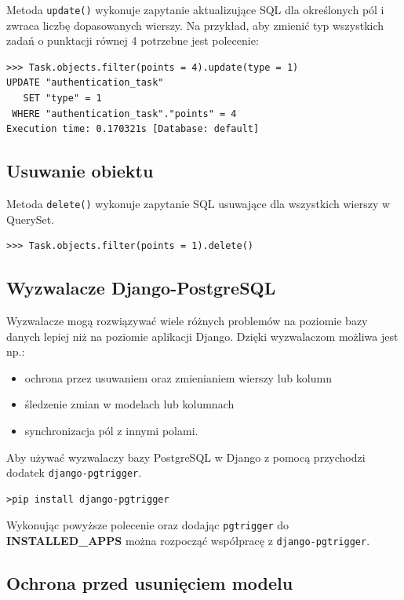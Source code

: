 \documentclass[oneside,polski,logo,indent]{amuthesis}
\begin{document}
Metoda \texttt{update()} wykonuje zapytanie aktualizujące SQL dla określonych pól i zwraca liczbę dopasowanych wierszy. Na przykład, aby zmienić typ wszystkich zadań o punktacji równej 4 potrzebne jest polecenie:
\begin{lstlisting}[style=DOS]
>>> Task.objects.filter(points = 4).update(type = 1)
UPDATE "authentication_task"
   SET "type" = 1
 WHERE "authentication_task"."points" = 4
Execution time: 0.170321s [Database: default]
\end{lstlisting}

\begin{center}
\subsection{Usuwanie obiektu}
\end{center}
Metoda \texttt{delete()} wykonuje zapytanie SQL usuwające dla wszystkich wierszy w QuerySet.
\begin{lstlisting}[style=DOS]
>>> Task.objects.filter(points = 1).delete()
\end{lstlisting}

\begin{center}
\section{Wyzwalacze Django-PostgreSQL}
\end{center}
Wyzwalacze mogą rozwiązywać wiele różnych problemów na poziomie bazy danych lepiej niż na poziomie aplikacji Django. Dzięki wyzwalaczom możliwa jest np.:
\begin{itemize}
\item ochrona przez usuwaniem oraz zmienianiem wierszy lub kolumn
\item śledzenie zmian w modelach lub kolumnach
\item synchronizacja pól z innymi polami.
\end{itemize}
Aby używać wyzwalaczy bazy PostgreSQL w Django z pomocą przychodzi dodatek \texttt{django-pgtrigger}.
\begin{lstlisting}[style=DOS]
>pip install django-pgtrigger
\end{lstlisting}
Wykonując powyższe polecenie oraz dodając \texttt{pgtrigger} do \textbf{INSTALLED\_APPS} można rozpocząć współpracę z \texttt{django-pgtrigger}.
\begin{center}
\subsection{Ochrona przed usunięciem modelu}
\end{center}
\end{document}
